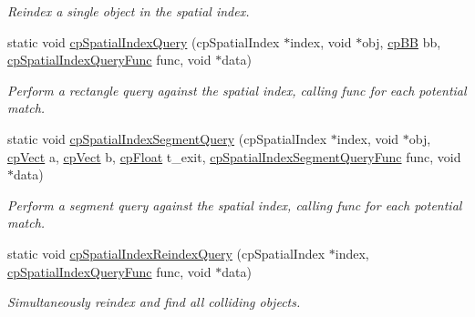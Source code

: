 \begin{DoxyCompactItemize}
\begin{DoxyCompactList}\small\item\em Reindex a single object in the spatial index. \end{DoxyCompactList}\item 
\hypertarget{group__cp_spatial_index_gaa812bf1ff2bfa9a0fcafc537be23e4a0}{}static void \hyperlink{group__cp_spatial_index_gaa812bf1ff2bfa9a0fcafc537be23e4a0}{cp\+Spatial\+Index\+Query} (cp\+Spatial\+Index $\ast$index, void $\ast$obj, \hyperlink{structcp_b_b}{cp\+B\+B} bb, \hyperlink{group__cp_spatial_index_ga7bcf80d017b29d32d9f8011405b241f9}{cp\+Spatial\+Index\+Query\+Func} func, void $\ast$data)\label{group__cp_spatial_index_gaa812bf1ff2bfa9a0fcafc537be23e4a0}

\begin{DoxyCompactList}\small\item\em Perform a rectangle query against the spatial index, calling {\ttfamily func} for each potential match. \end{DoxyCompactList}\item 
\hypertarget{group__cp_spatial_index_gae66f56fe8f12be66c696776d0430f18e}{}static void \hyperlink{group__cp_spatial_index_gae66f56fe8f12be66c696776d0430f18e}{cp\+Spatial\+Index\+Segment\+Query} (cp\+Spatial\+Index $\ast$index, void $\ast$obj, \hyperlink{structcp_vect}{cp\+Vect} a, \hyperlink{structcp_vect}{cp\+Vect} b, \hyperlink{group__basic_types_gac1ed65573e035bf892505768c852d8d3}{cp\+Float} t\+\_\+exit, \hyperlink{group__cp_spatial_index_ga829ef5f6fd840ea31370d53db9045373}{cp\+Spatial\+Index\+Segment\+Query\+Func} func, void $\ast$data)\label{group__cp_spatial_index_gae66f56fe8f12be66c696776d0430f18e}

\begin{DoxyCompactList}\small\item\em Perform a segment query against the spatial index, calling {\ttfamily func} for each potential match. \end{DoxyCompactList}\item 
static void \hyperlink{group__cp_spatial_index_ga04f6ebfd6288fbf058c116c033ae9eae}{cp\+Spatial\+Index\+Reindex\+Query} (cp\+Spatial\+Index $\ast$index, \hyperlink{group__cp_spatial_index_ga7bcf80d017b29d32d9f8011405b241f9}{cp\+Spatial\+Index\+Query\+Func} func, void $\ast$data)
\begin{DoxyCompactList}\small\item\em Simultaneously reindex and find all colliding objects. \end{DoxyCompactList}\end{DoxyCompactItemize}


